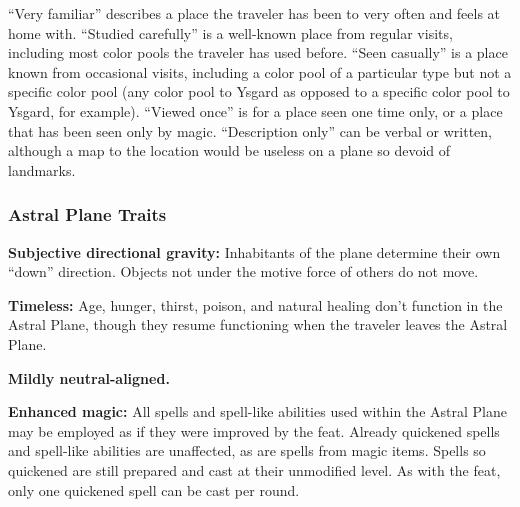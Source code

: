 
``Very familiar'' describes a place the traveler has been to very often and feels at home with. ``Studied carefully'' is a well-known place from regular visits, including most color pools the traveler has used before. ``Seen casually'' is a place known from occasional visits, including a color pool of a particular type but not a specific color pool (any color pool to Ysgard as opposed to a specific color pool to Ysgard, for example). ``Viewed once'' is for a place seen one time only, or a place that has been seen only by magic. ``Description only'' can be verbal or written, although a map to the location would be useless on a plane so devoid of landmarks.


\subsubsection{Astral Plane Traits}
\begin{itemize*}
\item \textbf{Subjective directional gravity:} Inhabitants of the plane determine their own ``down'' direction. Objects not under the motive force of others do not move.
\item \textbf{Timeless:} Age, hunger, thirst, poison, and natural healing don't function in the Astral Plane, though they resume functioning when the traveler leaves the Astral Plane.
\item \textbf{Mildly neutral-aligned.}
\item \textbf{Enhanced magic:} All spells and spell-like abilities used within the Astral Plane may be employed as if they were improved by the  feat. Already quickened spells and spell-like abilities are unaffected, as are spells from magic items. Spells so quickened are still prepared and cast at their unmodified level. As with the  feat, only one quickened spell can be cast per round.
\end{itemize*}
